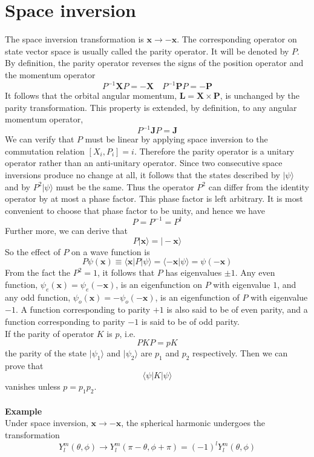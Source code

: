 \section{Space inversion}
The space inversion transformation is $\bm{x} \to -\bm{x}$. The corresponding operator on state vector space is usually called the parity operator. It will be denoted by $P$. By definition, the parity operator reverses the signs of the position operator and the momentum operator
\[P^{-1}\bm{X}P = -\bm{X} \quad P^{-1}\bm{P}P = -\bm{P}\]
It follows that the orbital angular momentum, $\bm{L} = \bm{X}\times\bm{P}$, is unchanged by the parity transformation. This property is extended, by definition, to any angular momentum operator,
\[P^{-1}\bm{J}P = \bm{J}\]
We can verify that $P$ must be linear by applying space inversion to the commutation relation $[X_i,P_i] = i$. Therefore the parity operator is a unitary operator rather than an anti-unitary operator. Since two consecutive space inversions produce no change at all, it follows that the states described by $|\psi\rangle$ and by $P^2|\psi\rangle$ must be the same. Thus the
operator $P^2$ can differ from the identity operator by at most a phase factor. This phase factor is left arbitrary. It is most convenient to choose that phase factor to be unity, and hence we have
\[P = P^{-1} = P^{\dagger}\]
Further more, we can derive that
\[P|\bm{x}\rangle = |-\bm{x}\rangle\]
So the effect of $P$ on a wave function is
\[P\psi(\bm{x}) \equiv \langle \bm{x} | P | \psi\rangle = \langle -\bm{x} | \psi\rangle = \psi(-\bm{x})\]
From the fact the $P^2=1$, it follows that $P$ has eigenvalues $\pm 1$. Any even function, $\psi_e(\bm{x}) = \psi_e(-\bm{x})$, is an eigenfunction on $P$ with eigenvalue $1$, and any odd function, $\psi_o(\bm{x}) = -\psi_o(-\bm{x})$, is an eigenfunction of $P$ with eigenvalue $-1$.
A function corresponding to parity $+1$ is also said to be of even parity, and a function corresponding to parity $-1$ is said to be of odd parity.\\
If the parity of operator $K$ is $p$, i.e. 
\[PKP = pK\] 
the parity of the state $|\psi_1\rangle$ and $|\psi_2\rangle$ are $p_1$ and $p_2$ respectively. Then we can prove that 
\[\langle \psi | K | \psi \rangle\]
vanishes unless $p = p_1 p_2$.
\\ \\
\textbf{Example}\\
Under space inversion, $\bm{x} \to -\bm{x}$, the spherical harmonic undergoes the transformation
\[Y_l^m(\theta,\phi) \to Y_l^m(\pi-\theta,\phi+\pi) = (-1)^l Y_l^m(\theta,\phi)\]
